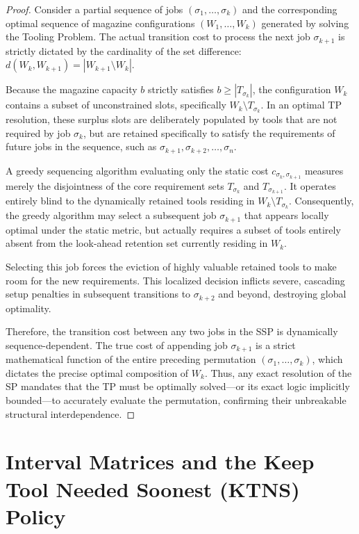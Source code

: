 \documentclass[11pt, a4paper]{book}
\begin{document}
	\begin{proof}
		Consider a partial sequence of jobs $(\sigma_1, \dots, \sigma_k)$ and the corresponding optimal sequence of magazine configurations $(W_1, \dots, W_k)$ generated by solving the Tooling Problem. The actual transition cost to process the next job $\sigma_{k+1}$ is strictly dictated by the cardinality of the set difference: $d(W_k, W_{k+1}) = |W_{k+1} \setminus W_k|$.
		
		Because the magazine capacity $b$ strictly satisfies $b \ge |T_{\sigma_k}|$, the configuration $W_k$ contains a subset of unconstrained slots, specifically $W_k \setminus T_{\sigma_k}$. In an optimal TP resolution, these surplus slots are deliberately populated by tools that are not required by job $\sigma_k$, but are retained specifically to satisfy the requirements of future jobs in the sequence, such as $\sigma_{k+1}, \sigma_{k+2}, \dots, \sigma_n$.
		
		A greedy sequencing algorithm evaluating only the static cost $c_{\sigma_k, \sigma_{k+1}}$ measures merely the disjointness of the core requirement sets $T_{\sigma_k}$ and $T_{\sigma_{k+1}}$. It operates entirely blind to the dynamically retained tools residing in $W_k \setminus T_{\sigma_k}$. Consequently, the greedy algorithm may select a subsequent job $\sigma_{k+1}$ that appears locally optimal under the static metric, but actually requires a subset of tools entirely absent from the look-ahead retention set currently residing in $W_k$. 
		
		Selecting this job forces the eviction of highly valuable retained tools to make room for the new requirements. This localized decision inflicts severe, cascading setup penalties in subsequent transitions to $\sigma_{k+2}$ and beyond, destroying global optimality. 
		
		Therefore, the transition cost between any two jobs in the SSP is dynamically sequence-dependent. The true cost of appending job $\sigma_{k+1}$ is a strict mathematical function of the entire preceding permutation $(\sigma_1, \dots, \sigma_k)$, which dictates the precise optimal composition of $W_k$. Thus, any exact resolution of the SP mandates that the TP must be optimally solved—or its exact logic implicitly bounded—to accurately evaluate the permutation, confirming their unbreakable structural interdependence.
	\end{proof}
	
	\section{Interval Matrices and the Keep Tool Needed Soonest (KTNS) Policy}
	
\end{document}

